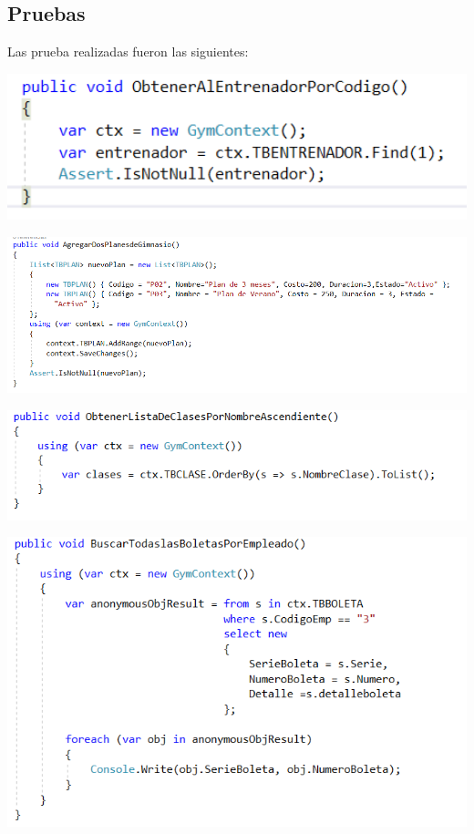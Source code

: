 \subsection{Pruebas}
Las prueba realizadas fueron las siguientes:
\begin{center}
\includegraphics[width=15cm]{./Imagenes/prueba1.png}
\end{center}
\begin{center}
\includegraphics[width=15cm]{./Imagenes/prueba2.png}
\end{center}
\begin{center}
\includegraphics[width=15cm]{./Imagenes/prueba3.png}
\end{center}
\begin{center}
\includegraphics[width=15cm]{./Imagenes/prueba4.png}
\end{center}
